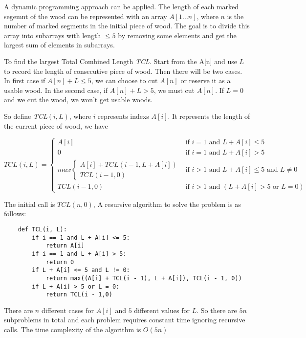 \documentclass[12pt,a4paper]{article}
\newcommand{\question}[1]{\bigskip\noindent{\textbf{Q{#1} solution}}}
\begin{document}
\question{18.A}

A dynamic programming approach can be applied. The length of each marked segemnt of the wood can be represented with an array $A[1...n]$, where $n$ is the number of marked segments in the initial piece of wood. The goal is to divide this array into subarrays with length $\le 5$ by removing some elements and get the largest sum of elements in subarrays. 

To find the largest Total Combined Length {\em TCL}. Start from the A[n] and use $L$ to record the length of consecutive piece of wood. 
Then there will be two cases. In first case if $A[n] + L \le 5$, we can choose to cut $A[n]$ or reserve it as a usable wood. In the second case, if $A[n] + L > 5$, we must cut $A[n]$. If $L = 0$ and we cut the wood, we won't get usable woods.

So define {\em TCL}$(i, L)$, where $i$ represents indexs $A[i]$. It represents the length of the current piece of wood, we have 

\begin{equation*}
TCL(i, L) = 
  \begin{cases}
	  A[i] & \mbox{if } i = 1 \mbox{ and } L + A[i] \le 5 \\
	  0 &  \mbox{if } i = 1 \mbox{ and } L + A[i] > 5 \\
      max
	  \begin{cases}
		A[i] + TCL( i - 1 , L + A[i]) \\
		TCL(i - 1, 0) 
	  \end{cases} & \mbox{if } i > 1 \mbox{ and } L + A[i] \le 5 \mbox{ and } L \neq 0\\
      TCL(i - 1,0) & \mbox{if } i > 1 \mbox{ and } (L + A[i] > 5 \mbox{ or } L = 0)
  \end{cases}
\end{equation*}

The initial call is $TCL(n, 0)$, A resursive algorithm to solve the problem is as follows:

\begin{lstlisting}
	def TCL(i, L):
		if i == 1 and L + A[i] <= 5:
			return A[i]
		if i == 1 and L + A[i] > 5:
			return 0
		if L + A[i] <= 5 and L != 0:
			return max((A[i] + TCL(i - 1), L + A[i]), TCL(i - 1, 0))
		if L + A[i] > 5 or L = 0:
			return TCL(i - 1,0)
\end{lstlisting}

There are $n$ different cases for $A[i]$ and $5$ different values for $L$. So there are $5n$ subproblems in total and each problem requires constant time ignoring recursive calls. The time complexity of the algorithm is $O(5n)$
\end{document}
